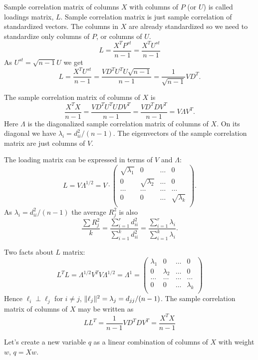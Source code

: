 \documentclass[12pt]{article}
\DeclarePairedDelimiter{\norm}{\lVert}{\rVert}
\begin{document}
Sample correlation matrix of columns $X$ with columns of $P$ (or $U$)  is called loadings matrix, $L$.
Sample correlation matrix is just sample correlation of standardized vectors. 
The columns in $X$ are already standardized so we need to standardize only columns of $P$, or columns of $U$.
\[
L = \frac{X^T P^{st}}{n - 1} = \frac{X^T U^{st}}{n - 1}
\]
As $U^{st} = \sqrt{n-1} U$ we get
\[
L =  \frac{X^T U^{st}}{n - 1} = \frac{VD^T U^T U\sqrt{n-1}}{n-1} = \frac{1}{\sqrt{n-1}}V D^T.
\]

The sample correlation matrix of columns of $X$ is
\[
\frac{X^T X}{n-1} = \frac{V D^T U^T UDV^T}{n - 1} = \frac{V D^T D V^T}{ n - 1} = V \Lambda V^T.
\]
Here $\Lambda$ is the diagonalized sample correlation matrix of columns of $X$.
On its diagonal we have $\lambda_i = d_{ii}^2 / (n - 1)$.
The eigenvectors of the sample correlation matrix are just columns of $V$. 

The loading matrix can be expressed in terms of $V$ and $\Lambda$:
\[
L = V \Lambda^{1/2} = V \cdot \begin{pmatrix}
    \sqrt{\lambda_1 } & 0 & \dots & 0 \\
    0  & \sqrt{\lambda_2} & \dots & 0 \\
    \dots & \dots & \dots & \dots \\
    0 & 0 & \dots & \sqrt{\lambda_k} \\
\end{pmatrix}.
\]
As $\lambda_i = d_{ii}^2 / (n-1)$ the average $R^2_j$ is also 
\[
\frac{\sum R_j^2}{k} =  \frac{\sum_{i=1}^r d_{ii}^2}{\sum_{i=1}^k d_{ii}^2} =  \frac{\sum_{i=1}^r \lambda_i}{\sum_{i=1}^k \lambda_i} .
\]

Two facts about $L$ matrix:
\[
L^T L = \Lambda^{1/2} V^T V \Lambda^{1/2} = \Lambda^1 =  \begin{pmatrix}
    \lambda_1 & 0 & \dots & 0 \\
    0  & \lambda_2 & \dots & 0 \\
    \dots & \dots & \dots & \dots \\
    0 & 0 & \dots & \lambda_k \\
\end{pmatrix}
\]
Hence $\ell_i \perp \ell_j$ for $i \neq j$, $\norm{\ell_j}^2= \lambda_j = d_{jj} / (n - 1)$.
The sample correlation matrix of columns of $X$ may be written as
\[
LL^T = \frac{1}{n-1}V D^T D V^T = \frac{X^TX}{n - 1}
\]


Let's create a new variable $q$ as a linear combination of columns of $X$ with weight $w$, $q = Xw$.
\end{document}
